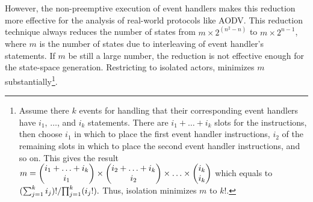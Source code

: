 However, the non-preemptive execution of event handlers makes this reduction more effective for the analysis of real-world protocols like AODV. This reduction technique always reduces the number of states from $m\times 2^{(n^2-n)}$ to $m\times2^{n-1}$, where $m$ is the number of states due to interleaving of event handler's statements. If $m$ be still a large number, the reduction is not effective enough for the state-space generation. Restricting to isolated actors, minimizes $m$ substantially\footnote{Assume there $k$ events for handling that their corresponding event handlers have $i_1$, $\ldots$, and $i_k$ statements. There are $i_1+\ldots+i_k$ slots for the instructions, then choose $i_1$ in which to place the first event handler instructions, $i_2$ of the remaining slots in which to place the second event handler instructions, and so on. This gives the result  ${\small m=\begin{pmatrix}
	i_1+\ldots+i_k\\
	i_1 \\
	\end{pmatrix}\times
\begin{pmatrix}
	i_2+\ldots+i_k\\
i_2 \\
\end{pmatrix}\times	\ldots\times
\begin{pmatrix}
i_k\\
i_k \\
\end{pmatrix}}$ which equals to ${\small %
{(\sum_{j=1}^{k} i_j)!}/{\prod_{j=1}^{k}(i_j!)}.}$ Thus, isolation minimizes $m$ to $k!$.}.  




